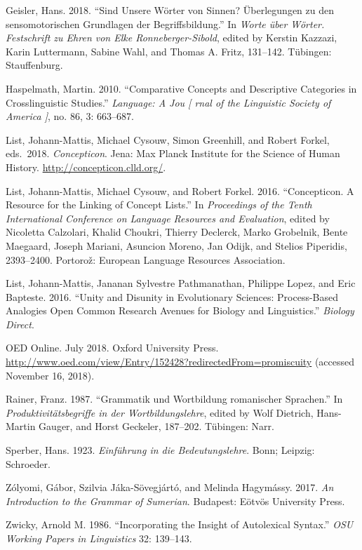\documentclass[
  english,
  a4paper,
  oneside,tablecaptionabove
]{scrbook}
\begin{document}
Geisler, Hans. 2018. \enquote{Sind Unsere Wörter von Sinnen?
Überlegungen zu den sensomotorischen Grundlagen der Begriffsbildung.} In
\emph{Worte über Wörter. Festschrift zu Ehren von Elke
Ronneberger-Sibold}, edited by Kerstin Kazzazi, Karin Luttermann,
Sabine Wahl, and Thomas A. Fritz, 131--142. Tübingen: Stauffenburg.

Haspelmath, Martin. 2010. \enquote{Comparative Concepts and
Descriptive Categories in Crosslinguistic Studies.} \emph{Language: A
Jou {[} rnal of the Linguistic Society of America {]}}, no. 86, 3:
663--687.

List, Johann-Mattis, Michael Cysouw, Simon Greenhill, and Robert
Forkel, eds.~2018. \emph{Concepticon}. Jena: Max Planck Institute for
the Science of Human History. \url{http://concepticon.clld.org/}.

List, Johann-Mattis, Michael Cysouw, and Robert Forkel. 2016.
\enquote{Concepticon. A Resource for the Linking of Concept Lists.} In
\emph{Proceedings of the Tenth International Conference on Language
Resources and Evaluation}, edited by Nicoletta Calzolari, Khalid
Choukri, Thierry Declerck, Marko Grobelnik, Bente Maegaard, Joseph
Mariani, Asuncion Moreno, Jan Odijk, and Stelios Piperidis, 2393--2400.
Portorož: European Language Resources Association.

List, Johann-Mattis, Jananan Sylvestre Pathmanathan, Philippe Lopez,
and Eric Bapteste. 2016. \enquote{Unity and Disunity in Evolutionary
Sciences: Process-Based Analogies Open Common Research Avenues for
Biology and Linguistics.} \emph{Biology Direct}.

OED Online. July 2018. Oxford University Press.
\url{http://www.oed.com/view/Entry/152428?redirectedFrom=promiscuity}
(accessed November 16, 2018).

Rainer, Franz. 1987. \enquote{Grammatik und Wortbildung romanischer
Sprachen.} In \emph{Produktivitätsbegriffe in der Wortbildungslehre},
edited by Wolf Dietrich, Hans-Martin Gauger, and Horst Geckeler,
187--202. Tübingen: Narr.

Sperber, Hans. 1923. \emph{Einführung in die Bedeutungslehre}.
Bonn; Leipzig: Schroeder.

Zólyomi, Gábor, Szilvia Jáka-Sövegjártó, and Melinda Hagymássy.
2017. \emph{An Introduction to the Grammar of Sumerian}. Budapest:
Eötvös University Press.

Zwicky, Arnold M. 1986. \enquote{Incorporating the Insight of
Autolexical Syntax.} \emph{OSU Working Papers in Linguistics} 32:
139--143.
\end{document}
